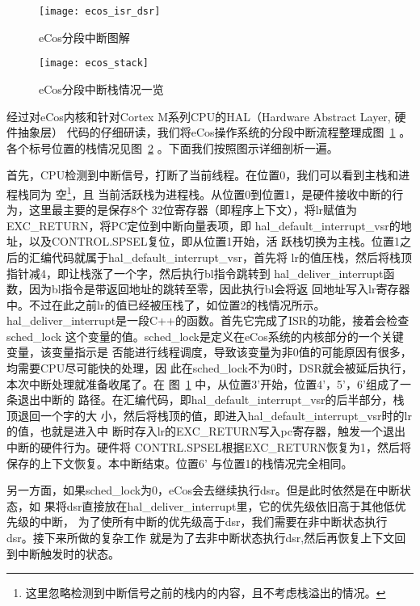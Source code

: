 \begin{figure}
	\centering
	\texttt{[image: ecos\_isr\_dsr]}
	\caption{eCos分段中断图解}
	\label{fig:ecos_isr_dsr}
\end{figure}

\begin{figure}
	\centering
	\texttt{[image: ecos\_stack]}
	\caption{eCos分段中断栈情况一览}
	\label{fig:ecos_stack}
\end{figure}

经过对eCos内核和针对Cortex M系列CPU的HAL（Hardware Abstract Layer, 硬件抽象层）
代码的仔细研读，我们将eCos操作系统的分段中断流程整理成图~\ref{fig:ecos_isr_dsr} 。
各个标号位置的栈情况见图~\ref{fig:ecos_stack} 。下面我们按照图示详细剖析一遍。

首先，CPU检测到中断信号，打断了当前线程。在位置0，我们可以看到主栈和进程栈同为
空\footnote{这里忽略检测到中断信号之前的栈内的内容，且不考虑栈溢出的情况。}，且
当前活跃栈为进程栈。从位置0到位置1，是硬件接收中断的行为，这里最主要的是保存8个
32位寄存器（即程序上下文），将lr赋值为EXC\_RETURN，将PC定位到中断向量表项，即
hal\_default\_interrupt\_vsr的地址，以及CONTROL.SPSEL复位，即从位置1开始，活
跃栈切换为主栈。位置1之后的汇编代码就属于hal\_default\_interrupt\_vsr，首先将
lr的值压栈，然后将栈顶指针减4，即让栈涨了一个字，然后执行bl指令跳转到
hal\_deliver\_interrupt函数，因为bl指令是带返回地址的跳转至零，因此执行bl会将返
回地址写入lr寄存器中。不过在此之前lr的值已经被压栈了，如位置2的栈情况所示。
hal\_deliver\_interrupt是一段C++的函数。首先它完成了ISR的功能，接着会检查sched\_lock
这个变量的值。sched\_lock是定义在eCos系统的内核部分的一个关键变量，该变量指示是
否能进行线程调度，导致该变量为非0值的可能原因有很多，均需要CPU尽可能快的处理，因
此在sched\_lock不为0时，DSR就会被延后执行，本次中断处理就准备收尾了。在
图~\ref{fig:ecos_isr_dsr} 中，从位置3'开始，位置4'，5'，6'组成了一条退出中断的
路径。在汇编代码，即hal\_default\_interrupt\_vsr的后半部分，栈顶退回一个字的大
小，然后将栈顶的值，即进入hal\_default\_interrupt\_vsr时的lr的值，也就是进入中
断时存入lr的EXC\_RETURN写入pc寄存器，触发一个退出中断的硬件行为。硬件将
CONTRL.SPSEL根据EXC\_RETURN恢复为1，然后将保存的上下文恢复。本中断结束。位置6'
与位置1的栈情况完全相同。

另一方面，如果sched\_lock为0，eCos会去继续执行dsr。但是此时依然是在中断状态，如
果将dsr直接放在hal\_deliver\_interrupt里，它的优先级依旧高于其他低优先级的中断，
为了使所有中断的优先级高于dsr，我们需要在非中断状态执行dsr。接下来所做的复杂工作
就是为了去非中断状态执行dsr,然后再恢复上下文回到中断触发时的状态。

